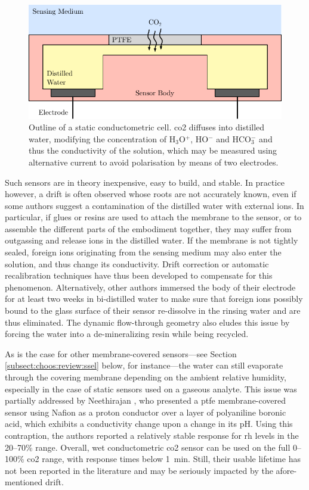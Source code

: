 \begin{figure}
	\centering
	\includegraphics{1_main_matter/choos_figures/review/wet_conduct}
	\caption[Outline of a static conductometric cell.]{Outline of a static conductometric cell. \gls{co2} diffuses into distilled water, modifying the concentration of H$_3$O$^+$, HO$^-$ and HCO$_3^-$ and thus the conductivity of the solution, which may be measured using alternative current to avoid polarisation by means of two electrodes.}
	\label{fig:choos:review:conduct_outline}
\end{figure}

Such sensors are in theory inexpensive, easy to build, and stable. In practice however, a drift is often observed whose roots are not accurately known, even if some authors suggest a contamination of the distilled water with external ions. In particular, if glues or resins are used to attach the membrane to the sensor, or to assemble the different parts of the embodiment together, they may suffer from outgassing and release ions in the distilled water\cite{mirtaheri2004a}. If the membrane is not tightly sealed, foreign ions originating from the sensing medium may also enter the solution, and thus change its conductivity. Drift correction\cite{tronstad2010} or automatic recalibration\cite{wall1995a} techniques have thus been developed to compensate for this phenomenon. Alternatively, other authors immersed the body of their electrode for at least two weeks in bi-distilled water to make sure that foreign ions possibly bound to the glass surface of their sensor re-dissolve in the rinsing water and are thus eliminated\cite{lis1979}. The dynamic flow-through geometry also eludes this issue by forcing the water into a de-mineralizing resin while being recycled.

As is the case for other membrane-covered sensors---see Section \ref{subsect:choos:review:ssel} below, for instance---the water can still evaporate through the covering membrane depending on the ambient relative humidity, especially in the case of static sensors used on a gaseous analyte. This issue was partially addressed by Neethirajan \etal{}\cite{neethirajan2010}, who presented a \gls{ptfe} membrane-covered sensor using Nafion as a proton conductor over a layer of polyaniline boronic acid, which exhibits a conductivity change upon a change in its pH. Using this contraption, the authors reported a relatively stable response for \gls{rh} levels in the 20--70\% range. Overall, wet conductometric \gls{co2} sensor can be used on the full 0--100\% \gls{co2} range, with response times below 1~min. Still, their usable lifetime has not been reported in the literature and may be seriously impacted by the afore-mentioned drift.

